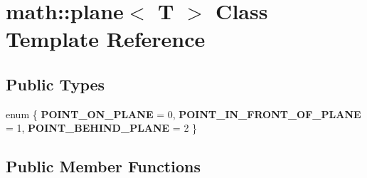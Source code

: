 \hypertarget{classmath_1_1plane}{
\section{math::plane$<$ T $>$ Class Template Reference}
\label{classmath_1_1plane}
}
\subsection*{Public Types}
\begin{DoxyCompactItemize}
\item 
enum \{ {\bfseries POINT\_\-ON\_\-PLANE} = 0, 
{\bfseries POINT\_\-IN\_\-FRONT\_\-OF\_\-PLANE} = 1, 
{\bfseries POINT\_\-BEHIND\_\-PLANE} = 2
 \}
\end{DoxyCompactItemize}
\subsection*{Public Member Functions}
